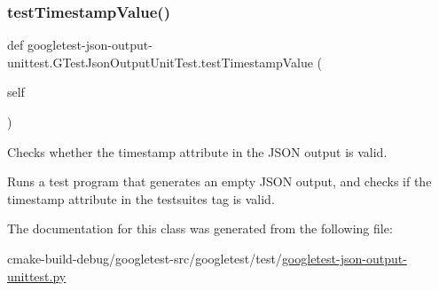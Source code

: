 \subsubsection{\texorpdfstring{testTimestampValue()}{testTimestampValue()}}
{\footnotesize\ttfamily def googletest-\/json-\/output-\/unittest.\+G\+Test\+Json\+Output\+Unit\+Test.\+test\+Timestamp\+Value (\begin{DoxyParamCaption}\item[{}]{self }\end{DoxyParamCaption})}

\begin{DoxyVerb}Checks whether the timestamp attribute in the JSON output is valid.

Runs a test program that generates an empty JSON output, and checks if
the timestamp attribute in the testsuites tag is valid.
\end{DoxyVerb}
 

The documentation for this class was generated from the following file\+:\begin{DoxyCompactItemize}
\item 
cmake-\/build-\/debug/googletest-\/src/googletest/test/\mbox{\hyperlink{googletest-json-output-unittest_8py}{googletest-\/json-\/output-\/unittest.\+py}}\end{DoxyCompactItemize}
